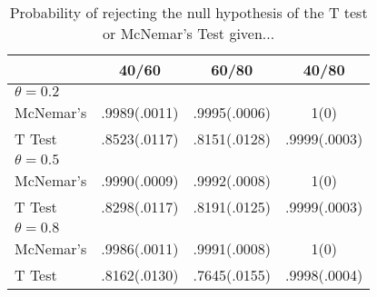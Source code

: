 \documentclass{article}
\begin{document}
\begin{table}[h!]
\centering
\begin{tabular}{ | l | c | c | c |}
\hline\hline
& \textbf{40/60} & \textbf{60/80} & \textbf{40/80} \\
\hline
\textbf{$\theta = 0.2$} & & & \\
\hspace{3mm} McNemar's & .9989(.0011) & .9995(.0006) & 1(0)  \\
\hspace{3mm} T Test & .8523(.0117) & .8151(.0128) & .9999(.0003)  \\
\hline
\textbf{$\theta = 0.5$} & & & \\
\hspace{3mm} McNemar's & .9990(.0009) & .9992(.0008)  & 1(0)  \\
\hspace{3mm} T Test & .8298(.0117) & .8191(.0125) & .9999(.0003) \\
\hline
\textbf{$\theta = 0.8$} & & & \\
\hspace{3mm} McNemar's & .9986(.0011) & .9991(.0008) & 1(0)  \\
\hspace{3mm} T Test & .8162(.0130) & .7645(.0155) & .9998(.0004) \\
\hline\hline
\end{tabular}
\caption{Probability of rejecting the null hypothesis of the T test or McNemar's Test given...}
\end{table}
\end{document}
